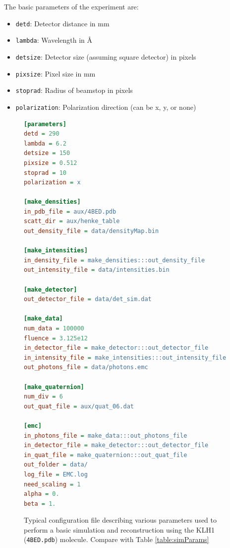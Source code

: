 \documentclass[]{iucr}              %
\begin{document}
The basic parameters of the experiment are:
\begin{itemize}
\item \texttt{detd}: Detector distance in mm
\item \texttt{lambda}: Wavelength in \AA
\item \texttt{detsize}: Detector size (assuming square detector) in pixels
\item \texttt{pixsize}: Pixel size in mm
\item \texttt{stoprad}: Radius of beamstop in pixels
\item \texttt{polarization}: Polarization direction (can be x, y, or none)
\end{itemize}

\begin{figure}
\begin{lstlisting}[language=ini]
[parameters]
detd = 290
lambda = 6.2
detsize = 150
pixsize = 0.512
stoprad = 10
polarization = x

[make_densities]
in_pdb_file = aux/4BED.pdb
scatt_dir = aux/henke_table
out_density_file = data/densityMap.bin

[make_intensities]
in_density_file = make_densities:::out_density_file
out_intensity_file = data/intensities.bin

[make_detector]
out_detector_file = data/det_sim.dat

[make_data]
num_data = 100000
fluence = 3.125e12
in_detector_file = make_detector:::out_detector_file
in_intensity_file = make_intensities:::out_intensity_file
out_photons_file = data/photons.emc

[make_quaternion]
num_div = 6
out_quat_file = aux/quat_06.dat

[emc]
in_photons_file = make_data:::out_photons_file
in_detector_file = make_detector:::out_detector_file
in_quat_file = make_quaternion:::out_quat_file
out_folder = data/
log_file = EMC.log
need_scaling = 1
alpha = 0.
beta = 1.
\end{lstlisting}
\caption{Typical configuration file describing various parameters used to perform a basic simulation and reconstruction using the KLH1 (\texttt{4BED.pdb}) molecule. Compare with Table \ref{table:simParams}}
\label{fig:config}
\end{figure}
\end{document}
